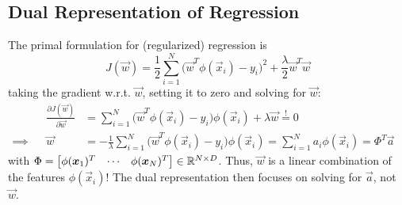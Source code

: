 		\subsection{Dual Representation of Regression}
			The primal formulation for (regularized) regression is
			\begin{equation}
				J(\vec{w}) = \frac{1}{2} \sum_{i = 1}^{N} \big( \vec{w}^T \phi(\vec{x}_i) - y_i \big)^2 + \frac{\lambda}{2} \vec{w}^T \vec{w}
			\end{equation}
			taking the gradient w.r.t. \( \vec{w} \), setting it to zero and solving for \(\vec{w}\):
			\begin{align}
				         &  & \frac{\partial J(\vec{w})}{\partial \vec{w}} & = \sum_{i = 1}^{N} \big(\vec{w}^T \phi(\vec{x}_i) - y_i\big) \phi(\vec{x}_i) + \lambda \vec{w} \overset{!}{=} 0                                           & \\
				\implies &  & \vec{w}                                      & = -\frac{1}{\lambda} \sum_{i = 1}^{N} \big( \vec{w}^T \phi(\vec{x}_i) - y_i \big) \phi(\vec{x}_i) = \sum_{i = 1}^{N} a_i \phi(\vec{x}_i) = \Phi^T \vec{a}
			\end{align}
			with \( \Phi = \begin{bmatrix} \phi(\bm{x}_1)^T & \cdots & \phi(\bm{x}_N)^T \end{bmatrix} \in \mathbb{R}^{N \times D} \). Thus, \(\vec{w}\) is a linear combination of the features \(\phi(\vec{x}_i)\)! The dual representation then focuses on solving for \(\vec{a}\), not \(\vec{w}\).

